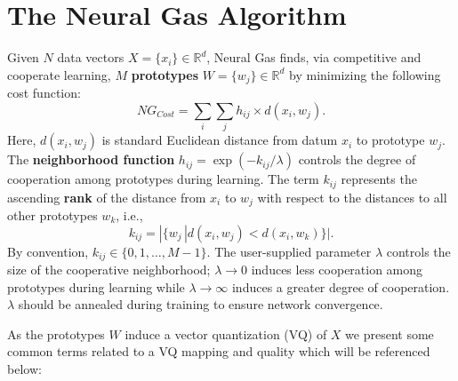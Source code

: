 \documentclass[11pt,]{article}
\begin{document}
\hypertarget{the-neural-gas-algorithm}{%
\section{The Neural Gas Algorithm}\label{the-neural-gas-algorithm}}

Given \(N\) data vectors \(X = \{x_i\} \in \mathbb{R}^d\), Neural Gas
\autocite{martinetz:gas} finds, via competitive and cooperate learning,
\(M\) \textbf{prototypes} \(W = \{w_j\} \in \mathbb{R}^d\) by minimizing
the following cost function: \begin{equation} \label{eq:NGcost}
NG_{Cost} = \sum\limits_i \sum\limits_j h_{ij} \times d(x_i, w_j). 
\end{equation} Here, \(d(x_i,w_j)\) is standard Euclidean distance from
datum \(x_i\) to prototype \(w_j\). The \textbf{neighborhood function}
\(h_{ij} = \exp(-k_{ij} / \lambda)\) controls the degree of cooperation
among prototypes during learning. The term \(k_{ij}\) represents the
ascending \textbf{rank} of the distance from \(x_i\) to \(w_j\) with
respect to the distances to all other prototypes \(w_k\), i.e.,
\[k_{ij} = | \{w_j \, | d(x_i,w_j) < d(x_i,w_k)\} |.\] By convention,
\(k_{ij} \in \{0,1,\ldots,M-1\}\). The user-supplied parameter
\(\lambda\) controls the size of the cooperative neighborhood;
\(\lambda \to 0\) induces less cooperation among prototypes during
learning while \(\lambda \to \infty\) induces a greater degree of
cooperation. \(\lambda\) should be annealed during training to ensure
network convergence.

As the prototypes \(W\) induce a vector quantization (VQ) of \(X\) we
present some common terms related to a VQ mapping and quality which will
be referenced below:
\end{document}

